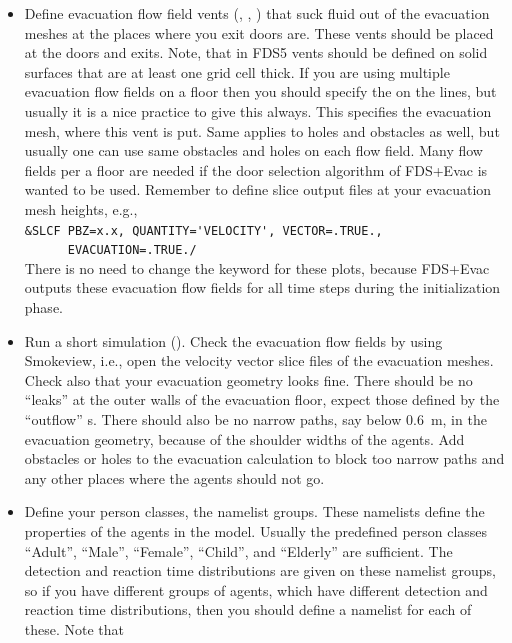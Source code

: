\documentclass[12pt,a4paper,final,twoside]{stylevk}
\begin{document}
\begin{itemize}
%
\item Define evacuation flow field vents (,
  , ) that suck fluid
  out of the evacuation meshes at the places where you exit doors are.
  These vents should be placed at the doors and exits. Note, that in
  FDS5 vents should be defined on solid surfaces that are at least one
  grid cell thick.  If you are using multiple evacuation flow fields
  on a floor then you should specify the  on the
   lines, but usually it is a nice practice to give this
  always.  This specifies the evacuation mesh, where this vent is put.
  Same applies to holes and obstacles as well, but usually one can use
  same obstacles and holes on each flow field.  Many flow fields per a
  floor are needed if the door selection algorithm of FDS+Evac is
  wanted to be used.  Remember to define slice output files at your
  evacuation mesh heights, e.g., \\
  \verb|&SLCF PBZ=x.x, QUANTITY='VELOCITY', VECTOR=.TRUE.,|\\
  \verb|      EVACUATION=.TRUE./|\\
  There is no need to change the  keyword for these
  plots, because FDS+Evac outputs these evacuation flow fields for all
  time steps during the initialization phase.
%
\item Run a short simulation ().  Check the
  evacuation flow fields by using Smokeview, i.e., open the
  velocity vector slice files of the evacuation meshes.  Check also
  that your evacuation geometry looks fine.  There should be no
  ``leaks'' at the outer walls of the evacuation floor, expect those
  defined by the ``outflow'' s.  There should also be no
  narrow paths, say below 0.6~m, in the evacuation geometry, because
  of the shoulder widths of the agents.  Add obstacles or
  holes to the evacuation calculation to block too narrow paths and
  any other places where the agents should not go.
%
\item Define your person classes, the  namelist groups.
  These namelists define the properties of the agents in the model.
  Usually the predefined person classes ``Adult'', ``Male'',
  ``Female'', ``Child'', and ``Elderly'' are sufficient.  The
  detection and reaction time distributions are given on these
  namelist groups, so if you have different groups of agents, which
  have different detection and reaction time distributions, then you
  should define a  namelist for each of these.  Note that

\end{itemize}
\end{document}

